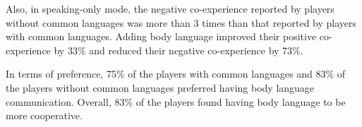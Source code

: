 Also, in speaking-only mode, the negative co-experience reported by players without common languages was more than 3 times than that reported by players with common languages. Adding body language improved their positive co-experience by 33\% and reduced their negative co-experience by 73\%. 

In terms of preference, 75\% of the players with common languages and 83\% of the players without common languages preferred having body language communication. Overall, 83\% of the players found having body language to be more cooperative.

